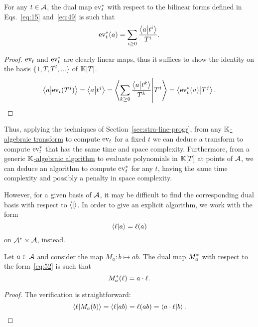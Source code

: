 \begin{lemma}
  \label{th:shoup}
  For any $t\in\mathcal{A}$, the dual map $\operatorname{ev}_t^\ast$ with respect to
  the bilinear forms defined in Eqs.~\eqref{eq:15} and~\eqref{eq:49}
  is such that
  \begin{equation}
    \label{eq:50}
    \operatorname{ev}_t^\ast(a) = \sum_{i\ge0}\frac{\left\langle a \middle| t^i \right\rangle}{T^{i}}
    \text{.}
  \end{equation}
\end{lemma}
\begin{proof}
  $\operatorname{ev}_t$ and $\operatorname{ev}_t^\ast$ are clearly linear maps, thus it suffices
  to show the identity on the basis $\{1,T,T^2,\ldots\}$ of $\mathbb{K}[T]$.
  \begin{equation}
    \label{eq:51}
    \left\langle a \middle| \operatorname{ev}_t(T^j) \right\rangle =
    \left\langle a \middle| t^j \right\rangle =
    \left\langle \sum_{k\ge0}\frac{\left\langle a \middle| t^k \right\rangle}{T^k} \middle| T^j \right\rangle =
    \left\langle \operatorname{ev}_t^\ast(a) \middle| T^j \right\rangle
    \text{.}
  \end{equation}
\end{proof}

Thus, applying the techniques of Section~\ref{sec:stra-line-progr},
from any \hyperref[def:algebraic-transform]{$\mathbb{K}$-algebraic transform}
to compute $\operatorname{ev}_t$ for a fixed $t$ we can deduce a transform to
compute $\operatorname{ev}_t^\ast$ that has the same time and space
complexity. Furthermore, from a generic
\hyperref[sec:r-algebr-algor]{$\mathbb{K}$-algebraic algorithm} to evaluate
polynomials in $\mathbb{K}[T]$ at points of $\mathcal{A}$, we can deduce an
algorithm to compute $\operatorname{ev}_t^\ast$ for any $t$, having the same time
complexity and possibly a penalty in space complexity.

However, for a given basis of $\mathcal{A}$, it may be difficult to find
the corresponding dual basis with respect to $\left\langle  \middle|  \right\rangle$. In order
to give an explicit algorithm, we work with the form
\begin{equation}
  \label{eq:52}
  \left\langle \ell \middle| a \right\rangle = \ell(a)
\end{equation}
on $\mathcal{A}^\ast\times\mathcal{A}$, instead.

\begin{lemma}
  Let $a\in\mathcal{A}$ and consider the map $M_a:b\mapsto ab$. The dual
  map $M_a^\ast$ with respect to the form~\eqref{eq:52} is
  such that
  \begin{equation}
    \label{eq:53}
    M_a^\ast(\ell) = a\cdot\ell
    \text{.}
  \end{equation}
\end{lemma}
\begin{proof}
  The verification is straightforward:
  \begin{equation}
    \label{eq:54}
    \left\langle \ell \middle| M_a(b) \right\rangle = \left\langle \ell \middle| ab \right\rangle = \ell(ab) =
    \left\langle a\cdot\ell \middle| b \right\rangle
    \text{.}
  \end{equation}
\end{proof}

